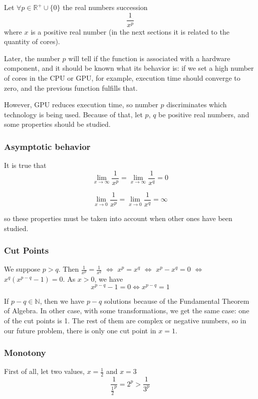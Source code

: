 \documentclass{article}
\begin{document}
Let \(\forall p \in \mathbb{R^+} \cup \{0\}\) the real numbers succession
\[
\frac{1}{{x^p}}
\]
where $x$ is a positive real number (in the next sections it is related to the quantity of cores).

Later, the number $p$ will tell if the function is associated with a hardware component, and it should be known what its behavior is: if we set a high number of cores in the CPU or GPU, for example, execution time should converge to zero, and the previous function fulfills that.

However, GPU reduces execution time, so number $p$ discriminates which technology is being used. Because of that, let $p$, $q$ be positive real numbers, and some properties should be studied.

\subsubsection{Asymptotic behavior}

It is true that
\[
\lim_{{x \to \infty}} \frac{1}{{x^p}}=\lim_{{x \to \infty}} \frac{1}{{x^q}}=0
\]

\[
\lim_{{x \to 0}} \frac{1}{{x^p}}=\lim_{{x \to 0}} \frac{1}{{x^q}}=\infty
\]

so these properties must be taken into account when other ones have been studied.

\subsubsection{Cut Points}

We suppose $p > q$. Then $\frac{1}{{x^p}}=\frac{1}{x^q}$ $\Leftrightarrow$ ${x^p}={x^q}$ $\Leftrightarrow$ ${x^p}-{x^q}=0$ $\Leftrightarrow$ ${x^q}({x^{p-q}}-1)=0$. As $x>0$, we have
\[
{x^{p-q}}-1=0 \Leftrightarrow {x^{p-q}}=1
\]

If ${p-q} \in \mathbb{N}$, then we have $p-q$ solutions because of the Fundamental Theorem of Algebra. In other case, with some transformations, we get the same case: one of the cut points is 1. The rest of them are complex or negative numbers, so in our future problem, there is only one cut point in $x=1$.

\subsubsection{Monotony}

First of all, let two values, $x=\frac{1}{2}$ and $x=3$
\[
	\frac{1}{\frac{1}{2}^p}={2^p} > \frac{1}{3^p}
\]
\end{document}
